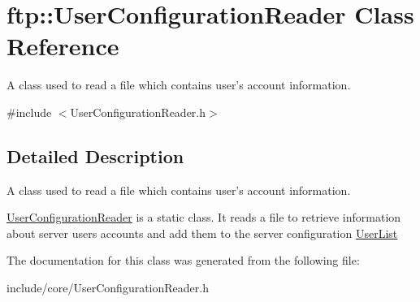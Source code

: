 \hypertarget{classftp_1_1_user_configuration_reader}{\section{ftp\-:\-:User\-Configuration\-Reader Class Reference}
\label{classftp_1_1_user_configuration_reader}
}


A class used to read a file which contains user's account information.  




{\ttfamily \#include $<$User\-Configuration\-Reader.\-h$>$}



\subsection{Detailed Description}
A class used to read a file which contains user's account information. 

\hyperlink{classftp_1_1_user_configuration_reader}{User\-Configuration\-Reader} is a static class. It reads a file to retrieve information about server users accounts and add them to the server configuration \hyperlink{classftp_1_1_user_list}{User\-List} 

The documentation for this class was generated from the following file\-:\begin{DoxyCompactItemize}
\item 
include/core/User\-Configuration\-Reader.\-h\end{DoxyCompactItemize}
